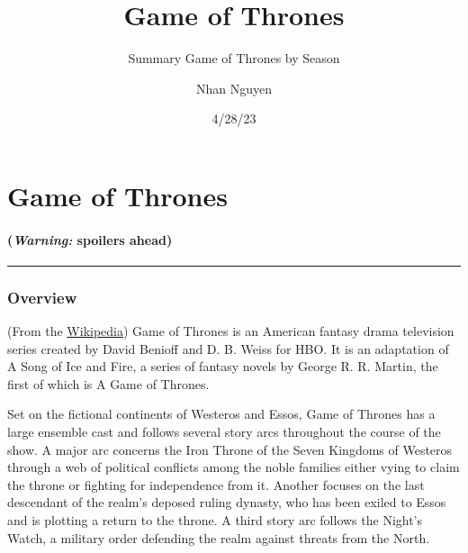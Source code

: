 \documentclass[
  letterpaper,
  DIV=11,
  numbers=noendperiod]{scrartcl}
\title{Game of Thrones}
\subtitle{Summary Game of Thrones by Season}
\author{Nhan Nguyen}
\date{4/28/23}
\let\oldparagraph\paragraph
\renewcommand{\paragraph}[1]{\oldparagraph{#1}\mbox{}}
\begin{document}
\maketitle
\ifdefined\Shaded\renewenvironment{Shaded}{\begin{tcolorbox}[breakable, interior hidden, boxrule=0pt, enhanced, borderline west={3pt}{0pt}{shadecolor}, frame hidden, sharp corners]}{\end{tcolorbox}}\fi

\listoffigures
\listoftables
\hypertarget{game-of-thrones}{%
\section{Game of Thrones}\label{game-of-thrones}}

\hypertarget{warning-spoilers-ahead}{%
\paragraph{\texorpdfstring{\textbf{(\emph{Warning:} spoilers
ahead)}}{(Warning: spoilers ahead)}}\label{warning-spoilers-ahead}}

\begin{center}\rule{0.5\linewidth}{0.5pt}\end{center}

\hypertarget{overview}{%
\subsubsection{Overview}\label{overview}}

(From the
\href{https://en.wikipedia.org/wiki/Game_of_Thrones\#Premise}{Wikipedia})
Game of Thrones is an American fantasy drama television series created
by David Benioff and D. B. Weiss for HBO. It is an adaptation of A Song
of Ice and Fire, a series of fantasy novels by George R. R. Martin, the
first of which is A Game of Thrones.

Set on the fictional continents of Westeros and Essos, Game of Thrones
has a large ensemble cast and follows several story arcs throughout the
course of the show. A major arc concerns the Iron Throne of the Seven
Kingdoms of Westeros through a web of political conflicts among the
noble families either vying to claim the throne or fighting for
independence from it. Another focuses on the last descendant of the
realm's deposed ruling dynasty, who has been exiled to Essos and is
plotting a return to the throne. A third story arc follows the Night's
Watch, a military order defending the realm against threats from the
North.
\end{document}
